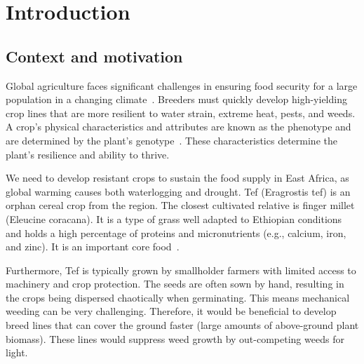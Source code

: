 \section{Introduction}\label{sec:introduction}

\subsection{Context and motivation}\label{subsec:context-n-motivation}
Global agriculture faces significant challenges in ensuring food security for a large population in a changing climate~\cite{furbankPhenomicsTechnologiesRelieve2011}. 
Breeders must quickly develop high-yielding crop lines that are more resilient to water strain, extreme heat, pests, and weeds.
A crop's physical characteristics and attributes are known as the phenotype and are determined by the plant's genotype~\cite{braytonPhenotyping2018}.
These characteristics determine the plant's resilience and ability to thrive.

We need to develop resistant crops to sustain the food supply in East Africa, as global warming causes both waterlogging and drought. 
Tef (Eragrostis tef) is an orphan cereal crop from the region. 
The closest cultivated relative is finger millet (Eleucine coracana).
It is a type of grass well adapted to Ethiopian conditions and holds a high percentage of proteins and micronutrients (e.g., calcium, iron, and zinc).
It is an important core food~\cite{redaAchievingFoodSecurity2014, tadeleEmpiricalReviewUse2021}.

Furthermore, Tef is typically grown by smallholder farmers with limited access to machinery and crop protection.
The seeds are often sown by hand, resulting in the crops being dispersed chaotically when germinating.
This means mechanical weeding can be very challenging.
Therefore, it would be beneficial to develop breed lines that can cover the ground faster (large amounts of above-ground plant biomass).
These lines would suppress weed growth by out-competing weeds for light.

